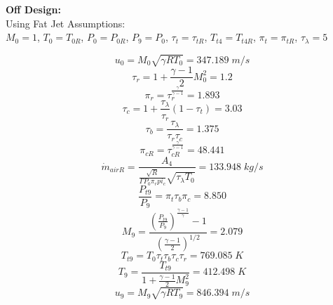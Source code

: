 \documentclass[conf]{new-aiaa}
\begin{document}
\clearpage
\noindent \textbf{Off Design:} \\

\noindent Using Fat Jet Assumptions:\\
$M_0 = 1$, $T_0 = T_{0R}$, $P_0 = P_{0R}$, $P_9 = P_0$, $\tau_t = \tau_{tR}$, $T_{t4} = T_{t4R}$, $\pi_t = \pi_{tR}$, $\tau_{\lambda} = 5$

\begin{equation*}
    u_{0} = M_{0} \sqrt{\gamma R T_{0}}
    =  347.189\;m/s
\end{equation*}
\begin{equation*}
    \tau_{r} = 1+\frac{\gamma-1}{2} M_{0}^2
    = 1.2
\end{equation*}
\begin{equation*}
    \pi_{r} = \tau_{r}^{\frac{\gamma}{\gamma-1}}
    = 1.893
\end{equation*}
\begin{equation*}
    \tau_c = 1 + \frac{\tau_{\lambda}}{\tau_r} \left(1-\tau_t\right)
    = 3.03
\end{equation*}
\begin{equation*}
    \tau_b = \frac{\tau_{\lambda}}{\tau_r \tau_c}
    = 1.375
\end{equation*}
\begin{equation*}
    \pi_{cR} = \tau_{cR}^{\frac{\gamma}{\gamma-1}}
    =  48.441
\end{equation*}
\begin{equation*}
    \dot{m}_{air R} = \frac{A_{4}}{\frac{\sqrt{R}}{\Gamma  P_{0}\pi_{r} pi_{c}} \sqrt{\tau_{\lambda} T_{0}}} 
    = 133.948\;kg/s
\end{equation*}
\begin{equation*}
    \frac{P_{t9}}{P_{9}} = \pi_{t} \tau_{b} \pi_{c}
    = 8.850
\end{equation*}
\begin{equation*}
    M_{9} = \frac{\left(\frac{P_{t9}}{P_{9}}\right)^{\frac{\gamma-1}{\gamma}} - 1}{\left(\frac{\gamma-1}{2}\right)^{1/2}}
    = 2.079 
\end{equation*}
\begin{equation*}
    T_{t9} = T_{0} \tau_{t} \tau_{b} \tau_{c} \tau_{r}
    = 769.085\;K
\end{equation*}
\begin{equation*}
    T_{9} = \frac{T_{t9}}{1+\frac{\gamma-1}{2} M_{9}^2}
    = 412.498\;K
\end{equation*}
\begin{equation*}
    u_{9} = M_{9} \sqrt{\gamma R T_{9}}
    = 846.394\;m/s
\end{equation*}\\
\end{document}
